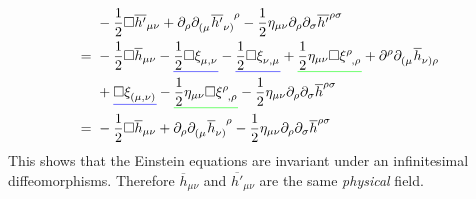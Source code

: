 \begin{equation}
    \begin{split}
        & -\frac{1}{2} \Box \overline{h'}_{\mu\nu} + \partial_\rho \tensor{\partial}{_(_\mu}\tensor{\overline{h'}}{_\nu_)^\rho}
        - \frac{1}{2} \eta_{\mu\nu}\partial_\rho\partial_\sigma \overline{h'}^{\rho\sigma} \\
        =\ & -\frac{1}{2}\Box\overline{h}_{\mu\nu} - \mathunderline{blue}{\frac{1}{2}\Box\tensor{\xi}{_\mu_,_\nu}}
        -\mathunderline{blue}{\frac{1}{2}\Box\tensor{\xi}{_\nu_,_\mu}}
        + \mathunderline{green}{\frac{1}{2} \eta_{\mu\nu}\Box\tensor{\xi}{^\rho_,_\rho}}
        + \partial^\rho \tensor{\partial}{_(_\mu}\tensor{\overline{h}}{_\nu_)_\rho} \\
        & + \mathunderline{blue}{\Box\tensor{\xi}{_(_\mu_,_\nu_)}}
        - \mathunderline{green}{\frac{1}{2}\eta_{\mu\nu}\Box\tensor{\xi}{^\rho_,_\rho}}
        - \frac{1}{2} \eta_{\mu\nu}\partial_\rho\partial_\sigma \overline{h}^{\rho\sigma} \\
        =\ & -\frac{1}{2} \Box \overline{h}_{\mu\nu} + \partial_\rho \tensor{\partial}{_(_\mu}\tensor{\overline{h}}{_\nu_)^\rho}
        - \frac{1}{2} \eta_{\mu\nu}\partial_\rho\partial_\sigma \overline{h}^{\rho\sigma}
    \end{split}
\end{equation}
This shows that the Einstein equations are invariant under an infinitesimal diffeomorphisms.
Therefore $\overline{h}_{\mu\nu}$ and $\overline{h'}_{\mu\nu}$ are the same \emph{physical} field.

